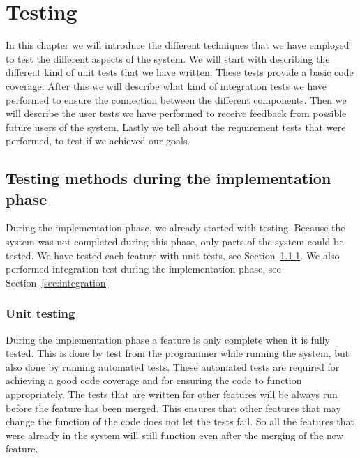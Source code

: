 \chapter{Testing}
\label{sec:testing}
In this chapter we will introduce the different techniques that we have employed to test the different aspects of the system.
We will start with describing the different kind of unit tests that we have written.
These tests provide a basic code coverage.
After this we will describe what kind of integration tests we have performed to ensure the connection between the different components.
Then we will describe the user tests we have performed to receive feedback from possible future users of the system.
Lastly we tell about the requirement tests that were performed, to test if we achieved our goals.

\section{Testing methods during the implementation phase}
During the implementation phase, we already started with testing.
Because the system was not completed during this phase, only parts of the system could be tested.
We have tested each feature with unit tests, see Section~\ref{sec:unit_test}.
We also performed integration test during the implementation phase, see Section~\ref{sec:integration}

\subsection{Unit testing}
\label{sec:unit_test}
During the implementation phase a feature is only complete when it is fully tested.
This is done by test from the programmer while running the system, but also done by running automated tests.
These automated tests are required for achieving a good code coverage and for ensuring the code to function appropriately.
The tests that are written for other features will be always run before the feature has been merged.
This ensures that other features that may change the function of the code does not let the tests fail.
So all the features that were already in the system will still function even after the merging of the new feature.

